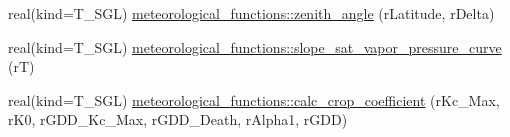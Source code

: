 \begin{DoxyCompactItemize}
\item 
real(kind=T\_\-SGL) \hyperlink{namespacemeteorological__functions_ac9ecb6e3268d4b67678af28b23cce215}{meteorological\_\-functions::zenith\_\-angle} (rLatitude, rDelta)
\item 
real(kind=T\_\-SGL) \hyperlink{namespacemeteorological__functions_a6236f001864bef39fdd6a688e9c0f430}{meteorological\_\-functions::slope\_\-sat\_\-vapor\_\-pressure\_\-curve} (rT)
\item 
real(kind=T\_\-SGL) \hyperlink{namespacemeteorological__functions_ad8a6559646c993f06e81444054cc0076}{meteorological\_\-functions::calc\_\-crop\_\-coefficient} (rKc\_\-Max, rK0, rGDD\_\-Kc\_\-Max, rGDD\_\-Death, rAlpha1, rGDD)
\end{DoxyCompactItemize}
